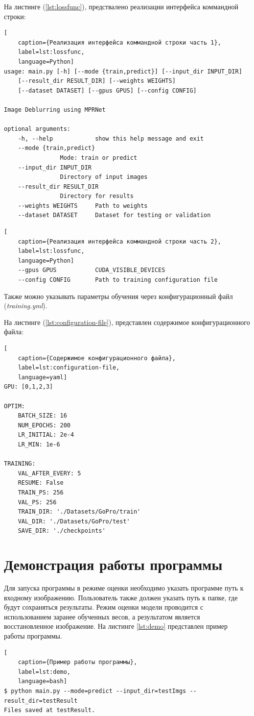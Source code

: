 На листинге (\ref{lst:lossfunc}), предствалено реализации интерфейса коммандной строки:
\begin{lstlisting}[
	caption={Реализация интерфейса коммандной строки часть 1},
	label=lst:lossfunc,
	language=Python]
usage: main.py [-h] [--mode {train,predict}] [--input_dir INPUT_DIR]
    [--result_dir RESULT_DIR] [--weights WEIGHTS]
    [--dataset DATASET] [--gpus GPUS] [--config CONFIG]

Image Deblurring using MPRNet

optional arguments:
    -h, --help            show this help message and exit
    --mode {train,predict}
                Mode: train or predict
    --input_dir INPUT_DIR
                Directory of input images
    --result_dir RESULT_DIR
                Directory for results
    --weights WEIGHTS     Path to weights
    --dataset DATASET     Dataset for testing or validation
\end{lstlisting}

\begin{lstlisting}[
    caption={Реализация интерфейса коммандной строки часть 2},
    label=lst:lossfunc,
    language=Python]
    --gpus GPUS           CUDA_VISIBLE_DEVICES
    --config CONFIG       Path to training configuration file
\end{lstlisting}

Также можно указывать параметры обучения через конфигурационный файл (\textit{training.yml}).

На листинге (\ref{lst:configuration-file}), представлен содержимое конфигурационного файла:
\begin{lstlisting}[
    caption={Содержимое конфигурационного файла},
    label=lst:configuration-file,
    language=yaml]
GPU: [0,1,2,3]

OPTIM:
    BATCH_SIZE: 16
    NUM_EPOCHS: 200
    LR_INITIAL: 2e-4
    LR_MIN: 1e-6

TRAINING:
    VAL_AFTER_EVERY: 5
    RESUME: False
    TRAIN_PS: 256
    VAL_PS: 256
    TRAIN_DIR: './Datasets/GoPro/train'
    VAL_DIR: './Datasets/GoPro/test'
    SAVE_DIR: './checkpoints'
\end{lstlisting}

\section{Демонстрация работы программы}

Для запуска программы в режиме оценки необходимо указать программе путь к входному изображению. Пользователь также должен указать путь к папке, где будут сохраняться результаты. Режим оценки модели проводится с использованием заранее обученных весов, а результатом является восстановленное изображение. На листинге \ref{lst:demo} представлен пример работы программы.
\begin{lstlisting}[
    caption={Пример работы программы},
    label=lst:demo,
    language=bash]
$ python main.py --mode=predict --input_dir=testImgs --result_dir=testResult
Files saved at testResult.
\end{lstlisting}

